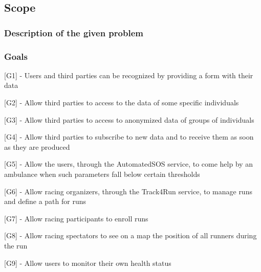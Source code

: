\subsection{Scope}
\subsubsection{Description of the given problem}
\subsubsection{Goals}
[G1] - Users and third parties can be recognized by providing a form with their data\newline

\hspace{-\parindent}[G2] - Allow third parties to access to the data of some specific individuals\newline

\hspace{-\parindent}[G3] - Allow third parties to access to anonymized data of groups of individuals\newline

\hspace{-\parindent}[G4] - Allow third parties to subscribe to new data and to receive them as soon as they are produced\newline

\hspace{-\parindent}[G5] - Allow the users, through the AutomatedSOS service, to come help by an ambulance when such parameters fall below certain thresholds\newline

\hspace{-\parindent}[G6] - Allow racing organizers, through the Track4Run service, to manage runs and define a path for runs\newline

\hspace{-\parindent}[G7] - Allow racing participants to enroll runs\newline

\hspace{-\parindent}[G8] - Allow racing spectators to see on a map the position of all runners during the run\newline

\hspace{-\parindent}[G9] - Allow users to monitor their own health status

